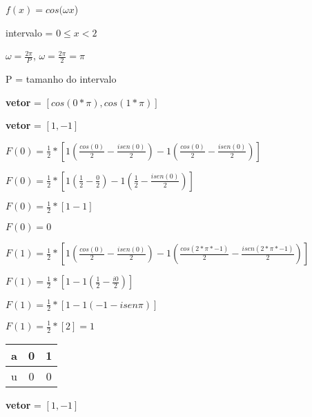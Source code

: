 \newpage

\begin{question}

    $f(x) = cos (\omega x$)

    intervalo = $0 \leq x < 2$ 

    $\omega = \frac{2\pi}{P}$, $\omega = \frac{2\pi}{2} = \pi$

    P = tamanho do intervalo

    \textbf{vetor} = $[ cos(0*\pi), cos(1*\pi) ]$

    \textbf{vetor} = $[ 1, -1 ]$
      
    $F(0) = \frac{1}{2} * [ 1(\frac{cos(0)}{2} - \frac{i sen(0)}{2}) -1(\frac{cos(0)}{2} - \frac{i sen(0)}{2}) ]$

    $F(0) = \frac{1}{2} * [ 1(\frac{1}{2} - \frac{0}{2}) -1(\frac{1}{2} - \frac{i sen(0)}{2}) ]$

    $F(0) = \frac{1}{2} * [ 1-1 ]$

    $F(0) = 0$ 

    \vspace*{0.5cm}

    $F(1) = \frac{1}{2} * [ 1(\frac{cos(0)}{2} - \frac{i sen(0)}{2}) -1(\frac{cos(2*\pi*-1)}{2} - \frac{i sen(2*\pi*-1)}{2}) ]$

    $F(1) = \frac{1}{2} * [ 1 -1(\frac{1}{2} - \frac{i 0}{2}) ]$

    $F(1) = \frac{1}{2} * [ 1 -1(-1 - i sen\pi) ]$

    $F(1) = \frac{1}{2} * [ 2 ] = 1$ 
    
    \begin{minipage}{\linewidth}
        \centering 
        \begin{tabular}{|c|c|c|}
            \hline
            a & 0 & 1 \\
            \hline
            u & 0 & 0 \\
            \hline
        \end{tabular}

    \end{minipage}
    
    \textbf{vetor} = $[ 1, -1 ]$

    \begin{minipage}{\linewidth}
        \centering 
    \end{minipage}
  
\end{question}

